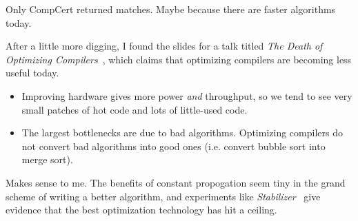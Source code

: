 \documentclass{article}
\begin{document}
Only CompCert returned matches.
Maybe because there are faster algorithms today.

After a little more digging, I found the slides for a talk titled \emph{The Death of Optimizing Compilers}~\cite{death-b}, which claims that optimizing compilers are becoming less useful today.
\begin{itemize}
\item
  Improving hardware gives more power \emph{and} throughput,
   so we tend to see very small patches of hot code and lots of little-used code.
\item
  The largest bottlenecks are due to bad algorithms.
  Optimizing compilers do not convert bad algorithms into good ones
  (i.e. convert bubble sort into merge sort).
\end{itemize}

Makes sense to me.
The benefits of constant propogation seem tiny in the grand scheme of writing a better algorithm, and experiments like \emph{Stabilizer}~\cite{stabilizer-cb} give evidence that the best optimization technology has hit a ceiling.

\vfill{}
\footnotesize


\end{document}
